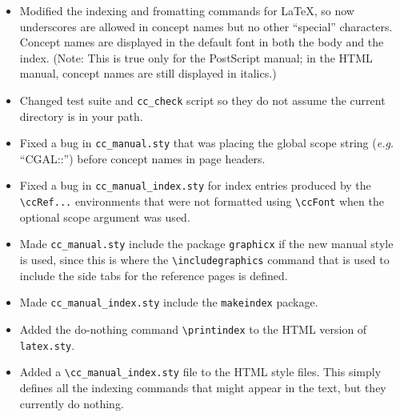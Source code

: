 \documentclass[11pt]{article}
\begin{document}
\begin{description}
\begin{itemize}
              used by \LaTeX.  If
              \verb|LATEX_CONV_INPUTS| is set, files are searched for in the
              indicated directories in the indicated order; if not set, files
              are searched for in the current directory.
       \item  Modified the indexing and fromatting commands for \LaTeX, so
              now underscores are allowed in concept names but no other
              ``special'' characters.  Concept names are displayed in the
              default font in both the body and the index. (Note: This
              is true only for the PostScript manual; in the HTML manual,
              concept names are still displayed in italics.)
       \item  Changed test suite and {\tt cc\_check} script so they do
              not assume the current directory is in your path.
       \item  Fixed a bug in \verb|cc_manual.sty| that was placing the global
              scope string ({\em e.g.} ``CGAL::'') before concept names in page
              headers.
       \item  Fixed a bug in \verb|cc_manual_index.sty| for index entries
              produced by the \verb|\ccRef...| environments that were not
              formatted using \verb|\ccFont| when the optional scope argument
              was used.
       \item  Made \verb|cc_manual.sty| include the package \verb|graphicx| if
              the new manual style is used, since this is where the
              \verb|\includegraphics| command that is used to include the side
              tabs for the reference pages is defined.
       \item  Made \verb|cc_manual_index.sty| include the \verb|makeindex|
              package.
       \item  Added the do-nothing command \verb|\printindex| to
              the HTML version of \verb|latex.sty|.
       \item  Added a \verb|\cc_manual_index.sty| file to the HTML style files.
              This simply defines all the indexing commands that might appear
              in the text, but they currently do nothing.
    \end{itemize}



\end{description}
\end{document}
